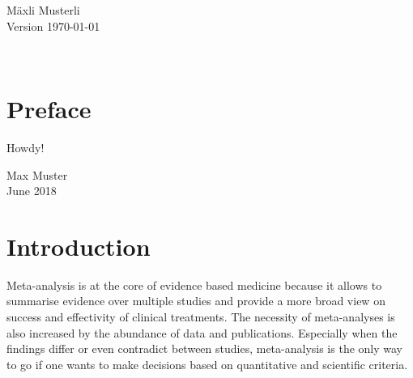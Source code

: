 \documentclass[11pt,a4paper,twoside]{book}\usepackage[]{graphicx}\usepackage[]{color}
\begin{document}





\graphicspath{{./figure/}}
\setcounter{tocdepth}{1}



\thispagestyle{empty}
\begin{center}
  \vspace*{6cm}{\bfseries\Huge
  $p$-values:\\[5mm] their use, abuse and proper use \\[5mm]
  illustrated with seven facets 
  }
  \vfill
  \rm

  \LARGE
  M\"axli Musterli\\[12mm]
  
  \normalsize
  Version \today
\end{center}
\newpage
\thispagestyle{empty}~
\newpage
{}

\thispagestyle{plain}
\tableofcontents
{}

\chapter*{Preface}
\thispagestyle{plain}

Howdy!

\bigskip

\begin{flushright}
  Max Muster\\
  June 2018
\end{flushright}


\cleardoublepage
{}







\chapter{Introduction}

Meta-analysis is at the core of evidence based medicine because it allows to summarise evidence over multiple studies and provide a more broad view on success and effectivity of clinical treatments. The necessity of meta-analyses is also increased by the abundance of data and publications. Especially when the findings differ or even contradict between studies, meta-analysis is the only way to go if one wants to make decisions based on quantitative and scientific criteria.
\end{document}
